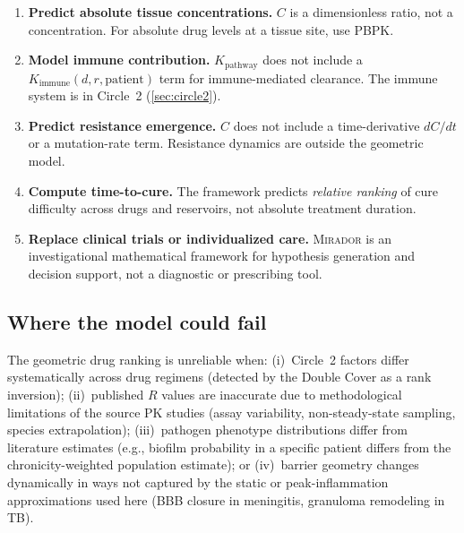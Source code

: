\documentclass[11pt]{article}
\theoremstyle{plain}
\theoremstyle{definition}
\newcommand{\mirador}{\textsc{Mirador}}
\newcommand{\Kpath}{K_{\mathrm{pathway}}}
\begin{document}
\begin{enumerate}
  \item \textbf{Predict absolute tissue concentrations.}
    $C$ is a dimensionless ratio, not a concentration. For
    absolute drug levels at a tissue site, use PBPK.

  \item \textbf{Model immune contribution.}
    $\Kpath$ does not include a $K_{\mathrm{immune}}(d, r,
    \mathrm{patient})$ term for immune-mediated clearance. The
    immune system is in Circle~2 (\cref{sec:circle2}).

  \item \textbf{Predict resistance emergence.}
    $C$ does not include a time-derivative
    $dC/dt$ or a mutation-rate term. Resistance dynamics
    are outside the geometric model.

  \item \textbf{Compute time-to-cure.}
    The framework predicts \emph{relative ranking} of cure
    difficulty across drugs and reservoirs, not absolute
    treatment duration.

  \item \textbf{Replace clinical trials or individualized care.}
    \mirador{} is an investigational mathematical framework
    for hypothesis generation and decision support, not a
    diagnostic or prescribing tool.
\end{enumerate}

\subsection{Where the model could fail}
\label{sec:could-fail}

The geometric drug ranking is unreliable when:
(i)~Circle~2 factors differ systematically across drug regimens
(detected by the Double Cover as a rank inversion);
(ii)~published $R$ values are inaccurate due to methodological
limitations of the source PK studies (assay variability,
non-steady-state sampling, species extrapolation);
(iii)~pathogen phenotype distributions differ from literature
estimates (e.g., biofilm probability in a specific patient differs
from the chronicity-weighted population estimate); or
(iv)~barrier geometry changes dynamically in ways not captured by
the static or peak-inflammation approximations used here (BBB
closure in meningitis, granuloma remodeling in TB).
\end{document}
